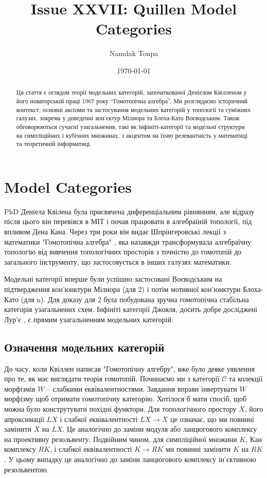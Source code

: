 \documentclass{article}
\begin{document}
\title{Issue XXVII: Quillen Model Categories}
\author{Namdak Tonpa}
\date{\today}

\maketitle

\begin{abstract}
Ця стаття є оглядом теорії модельних категорій, започаткованої Деніелом Квілленом у його новаторській праці 1967 року ``Гомотопічна алгебра''. Ми розглядаємо історичний контекст, основні аксіоми та застосування модельних категорій у топології та суміжних галузях, зокрема у доведенні кон’єктур Мілнора та Блоха-Като Воєводським. Також обговорюються сучасні узагальнення, такі як інфініті-категорії та модельні структури на симпліційних і кубічних множинах, з акцентом на їхню релевантність у математиці та теоретичній інформатиці.
\end{abstract}

\ifincludeTOC
  \tableofcontents
\fi


\section{Model Categories}
PhD Деніела Квілена була присвячена диференціальним рівнянням, але відразу після цього він перевівся в МІТ і почав працювати в алгебраїній топології, під впливом Дена Кана. Через три роки він видає Шпрінгеровські лекції з математики "Гомотопічна алгебра" \cite{Quillen67}, яка назавжди трансформувала алгебраїчну топологію від вивчення топологічних просторів з точністю до гомотопій до загального інструменту, що застосовується в інших галузях математики.

Модельні категорії вперше були успішно застосовані Воєводським на підтвердження кон'юнктури Мілнора \cite{Voevodsky96} (для 2) і потім мотивної кон'юнктури Блоха-Като \cite{Voevodsky03} (для n). Для доказу для 2 була побудована зручна гомотопічна стабільна категорія узагальнених схем. Інфініті категорії Джояля, досить добре досліджені Лур'є \cite{Lurie09}, є прямим узагальненням модельних категорій.

\subsection{Означення модельних категорій}
До часу, коли Квіллен написав "Гомотопічну алгебру", вже було деяке уявлення про те,
як має виглядати теорія гомотопій. Починаємо ми з категорії $\mathcal{C}$ та колекції морфізмів $W$ –
слабкими еквівалентностями. Завдання вправи інвертувати $W$ морфізму щоб отримати гомотопічну категорію.
Хотілося б мати спосіб, щоб можна було конструтувати похідні функтори. Для топологічного простору $X$,
його апроксимації $LX$ і слабкої еквівалентності $LX \to X$ це означає, що ми повинні
замінити $X$ на $LX$. Це аналогічно до заміни модуля або ланцюгового комплексу на
проективну резольвенту. Подвійним чином, для симпліційної множини $K$, Кан комплексу $RK$,
і слабкої еквівалентності $K \to RK$ ми повинні замінити $K$ на $RK$. У цьому випадку це
аналогічно до заміни ланцюгового комплексу ін'єктивною резольвентою.
\end{document}
